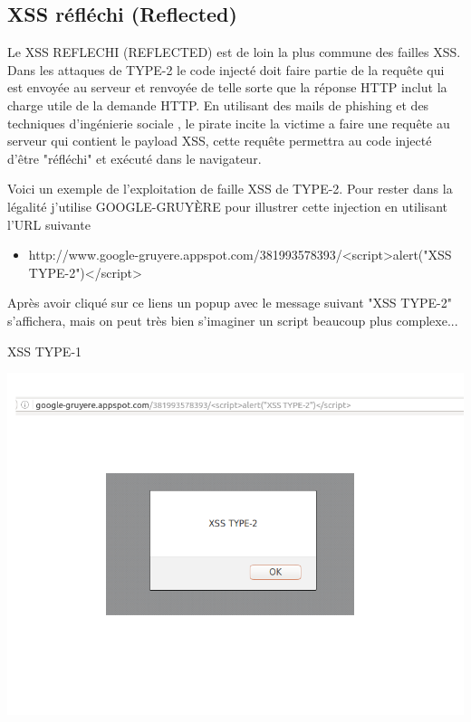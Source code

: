 \bigskip

\subsection{XSS réfléchi (Reflected)}\label{vulnerabilites:web:xss:reflected}

Le XSS REFLECHI (REFLECTED) est de loin la plus commune des failles XSS. Dans les attaques de TYPE-2 le code injecté doit faire partie de la requête qui est envoyée au serveur et renvoyée de telle sorte que la réponse HTTP inclut la charge utile de la demande HTTP. En utilisant des mails de phishing  et des techniques d'ingénierie sociale , le pirate incite la victime a faire une requête au serveur qui contient le payload XSS, cette requête permettra au code injecté d'être "réfléchi" et exécuté dans le navigateur.

\begin{flushleft}
Voici un exemple de l'exploitation de faille XSS de TYPE-2. Pour rester dans la légalité j'utilise GOOGLE-GRUYÈRE pour illustrer cette injection en utilisant l'URL suivante 
\end{flushleft}

\bigskip

\begin{itemize}
\item http://www.google-gruyere.appspot.com/381993578393/<script>alert("XSS TYPE-2")</script>
\end{itemize}

\begin{flushleft}
Après avoir cliqué sur ce liens un popup avec le message suivant "XSS TYPE-2" s'affichera, mais on peut très bien s'imaginer un script beaucoup plus complexe...
\end{flushleft} 

\bigskip

\begin{center}
\caption{XSS TYPE-1}
\includegraphics[scale=0.3]{Web/assets/xsst2.png}
\end{center}

